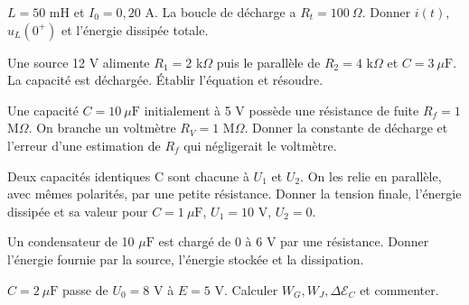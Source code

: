 \begin{questions}
\item $L=50$ mH et $I_0=0{,}20$ A. La boucle de décharge a $R_t=100\ \Omega$. Donner $i(t)$, $u_L(0^+)$ et l’énergie dissipée totale.
\end{questions}



\begin{questions}
\item Une source 12 V alimente $R_1=2$ k$\Omega$ puis le parallèle de $R_2=4$ k$\Omega$ et $C=3\ \mu\mathrm{ F}$. La capacité est déchargée. Établir l’équation et résoudre.
\end{questions}

\begin{questions}
\item Une capacité $C=10\ \mu\mathrm{ F}$ initialement à 5 V possède une résistance de fuite $R_f=1$ M$\Omega$. On branche un voltmètre $R_V=1$ M$\Omega$. Donner la constante de décharge et l’erreur d’une estimation de $R_f$ qui négligerait le voltmètre.
\end{questions}

\begin{questions}
\item Deux capacités identiques C sont chacune à $U_1$ et $U_2$. On les relie en parallèle, avec mêmes polarités, par une petite résistance. Donner la tension finale, l’énergie dissipée et sa valeur pour $C=1\ \mu\mathrm{ F}$, $U_1=10$ V, $U_2=0$.
\end{questions}



\begin{questions}
\item Un condensateur de 10 $\mu\mathrm{ F}$ est chargé de 0 à 6 V par une résistance. Donner l’énergie fournie par la source, l’énergie stockée et la dissipation.
\end{questions}

\begin{questions}
\item $C=2\ \mu\mathrm{ F}$ passe de $U_0=8$ V à $E=5$ V. Calculer $W_G,W_J,\Delta\mathcal E_C$ et commenter.
\end{questions}

